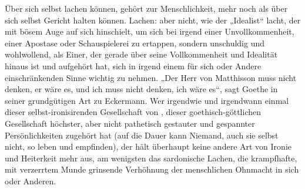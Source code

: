 Über sich selbst lachen können, gehört zur Menschlichkeit, mehr noch als über sich selbst Gericht halten können. Lachen: aber nicht, wie der „Idealist“ lacht, der mit bösem Auge auf sich hinschielt, um sich bei irgend einer Unvollkommenheit, einer Apostase oder Schauspielerei zu ertappen, sondern unschuldig und wohlwollend, als Einer, der gerade über seine Vollkommenheit und Idealität hinaus ist und aufgehört hat, sich in irgend einem für sich oder Andere einschränkenden Sinne wichtig zu nehmen. „Der Herr von Matthisson muss nicht denken, er wäre es, und ich muss nicht denken, ich wäre es“, sagt Goethe in seiner grundgütigen Art zu Eckermann. Wer irgendwie und irgendwann einmal dieser selbst-ironisirenden Gesellschaft von   , dieser goethisch-göttlichen Gesellschaft höchster, aber nicht pathetisch gestauter und gespannter Persönlichkeiten zugehört hat (auf die Dauer kann Niemand, auch sie selbst nicht, so leben und empfinden), der hält überhaupt keine andere Art von Ironie und Heiterkeit mehr aus, am wenigsten das sardonische Lachen, die krampfhafte, mit verzerrtem Munde grinsende Verhöhnung der menschlichen Ohnmacht in sich oder Anderen.
\par

